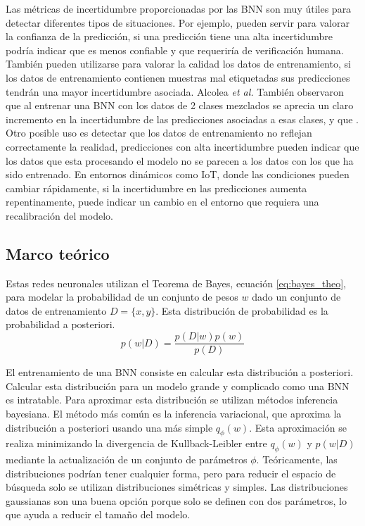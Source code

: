 Las métricas de incertidumbre proporcionadas por las BNN son muy útiles para detectar diferentes tipos de situaciones. Por ejemplo, pueden servir para valorar la confianza de la predicción, si una predicción tiene una alta incertidumbre podría indicar que es menos confiable y que requeriría de verificación humana. También pueden utilizarse para valorar la calidad los datos de entrenamiento, si los datos de entrenamiento contienen muestras mal etiquetadas sus predicciones tendrán una mayor incertidumbre asociada. Alcolea \emph{et al.} \cite{bnn_hyper_uncertainty}  También observaron que al entrenar una BNN con los datos de 2 clases mezclados se aprecia un claro incremento en la incertidumbre de las predicciones asociadas a esas clases, y que . Otro posible uso es detectar que los datos de entrenamiento no reflejan correctamente la realidad, predicciones con alta incertidumbre pueden indicar que los datos que esta procesando el modelo no se parecen a los datos con los que ha sido entrenado. En entornos dinámicos como IoT, donde las condiciones pueden cambiar rápidamente, si la incertidumbre en las predicciones aumenta repentinamente, puede indicar un cambio en el entorno que requiera una recalibración del modelo.

\subsection{Marco teórico} \label{sec:bnn_formulas}

Estas redes neuronales utilizan el Teorema de Bayes,  ecuación \ref{eq:bayes_theo}, para modelar la probabilidad de un conjunto de pesos $w$ dado un conjunto de datos de entrenamiento $D = \{x, y\}$. Esta distribución de probabilidad es la probabilidad a posteriori.
\begin{equation} \label{eq:bayes_theo}
p(w|D) = \dfrac{p(D|w) p(w)}{p(D)}
\end{equation}

El entrenamiento de una BNN consiste en calcular esta distribución a posteriori. Calcular esta distribución para un modelo grande y complicado como una BNN es intratable. Para aproximar esta distribución se utilizan métodos inferencia bayesiana. El método más común es la inferencia variacional, que aproxima la distribución a posteriori usando una más simple $q_{\phi}(w)$. Esta aproximación se realiza minimizando la divergencia de Kullback-Leibler \cite{kl_divergence} entre $q_{\phi}(w)$ y $p(w|D)$ mediante la actualización de un conjunto de parámetros $\phi$. Teóricamente, las distribuciones podrían tener cualquier forma, pero para reducir el espacio de búsqueda solo se utilizan distribuciones simétricas y simples. Las distribuciones gaussianas son una buena opción porque solo se definen con dos parámetros, lo que ayuda a reducir el tamaño del modelo.

